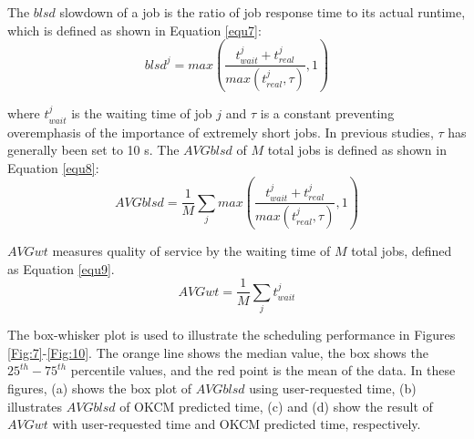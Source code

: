 \documentclass[a4paper,fleqn]{cas-sc}
\begin{document}
The $blsd$ slowdown of a job is the ratio of job response time to its actual runtime, which is defined as shown in Equation \ref{equ7}:
\begin{equation} \label{equ7}
blsd^j=max\left(\frac{t_{wait}^{j}+t_{real}^{j}}{max\left(t_{real}^{j},\tau\right)},1\right)
\end{equation}

where $t_{wait}^{j}$ is the waiting time of job $j$ and $\tau$ is a constant preventing overemphasis of the importance of extremely short jobs. In previous studies, $\tau$ has generally been set to 10 s. The $A\!V\!Gblsd$ of $M$ total jobs is defined as shown in Equation \ref{equ8}:
\begin{equation} \label{equ8}
A\!V\!Gblsd=\frac{1}{M}\sum_{j}max\left(\frac{t_{wait}^{j}+t_{real}^{j}}{max\left(t_{real}^{j},\tau\right)},1\right)
\end{equation}

$A\!V\!Gwt$ measures quality of service by the waiting time of $M$ total jobs, defined as Equation \ref{equ9}.
\begin{equation} \label{equ9}
A\!V\!Gwt=\frac{1}{M}\sum_{j}t_{wait}^j
\end{equation}

The box-whisker plot is used to illustrate the scheduling performance in Figures \ref{Fig:7}-\ref{Fig:10}. The orange line shows the median value, the box shows the $25^{th}-75^{th}$ percentile values, and the red point is the mean of the data. In these figures, (a) shows the box plot of $A\!V\!Gblsd$ using user-requested time, (b) illustrates $A\!V\!Gblsd$ of OKCM predicted time, (c) and (d) show the result of $A\!V\!Gwt$ with user-requested time and OKCM predicted time, respectively.
\end{document}
